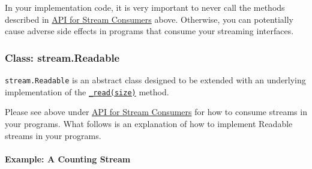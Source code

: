 \begin{Shaded}
\begin{Highlighting}[]
\NormalTok{>}
\NormalTok{>}
  \BaseNTok{[_write][]}\NormalTok{><}
\NormalTok{>}
\end{Highlighting}
\end{Shaded}

\begin{Shaded}
\begin{Highlighting}[]
\NormalTok{>}
\NormalTok{>}
  \NormalTok{><}
\NormalTok{>}
\end{Highlighting}
\end{Shaded}

In your implementation code, it is very important to never call the
methods described in
\hyperref[streamux5fapiux5fforux5fstreamux5fconsumers]{API for Stream
Consumers} above. Otherwise, you can potentially cause adverse side
effects in programs that consume your streaming interfaces.

\subsubsection{Class: stream.Readable}\label{class-stream.readable-1}

\texttt{stream.Readable} is an abstract class designed to be extended
with an underlying implementation of the
\hyperref[streamux5freadableux5freadux5fsizeux5f1]{\texttt{\_read(size)}}
method.

Please see above under
\hyperref[streamux5fapiux5fforux5fstreamux5fconsumers]{API for Stream
Consumers} for how to consume streams in your programs. What follows is
an explanation of how to implement Readable streams in your programs.

\paragraph{Example: A Counting Stream}\label{example-a-counting-stream}

